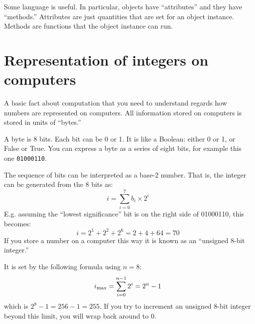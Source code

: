 Some language is useful. In particular, objects have ``attributes''
and they have ``methods.'' Attributes are just quantities that are set
for an object instance. Methods are functions that the object instance
can run. 

\section{Representation of integers on computers}

A basic fact about computation that you need to understand regards how
numbers are represented on computers. All information stored on
computers is stored in units of ``bytes.''


\begin{answer}
  A byte is 8 bits. Each bit can be 0 or 1. It is like a Boolean:
  either 0 or 1, or False or True. You can express a byte as a series
  of eight bits, for example this one {\tt 01000110}.
\end{answer}


\begin{answer}
  The sequence of bits can be interpreted as a base-2 number. That is,
  the integer can be generated from the 8 bits as:
\begin{equation}
i = \sum_{i=0}^7 b_i \times 2^i
\end{equation}
E.g. assuming the ``lowest significance'' bit is on the right side of
01000110, this becomes:
\begin{equation}
i = 2^1 + 2^2 + 2^6 = 2 + 4 + 64 = 70
\end{equation}
If you store a number on a computer this way it is known as an
``unsigned 8-bit integer.''
\end{answer}


\begin{answer}
  It is set by the following formula using $n=8$:
  \begin{equation}
    i_{\rm max} = \sum_{i=0}^{n-1} 2^i = 2^n - 1
  \end{equation}
  which is $2^8 - 1 = 256 - 1 = 255$. If you try to increment an
  unsigned 8-bit integer beyond this limit, you will wrap back around to
  0.
\end{answer}


